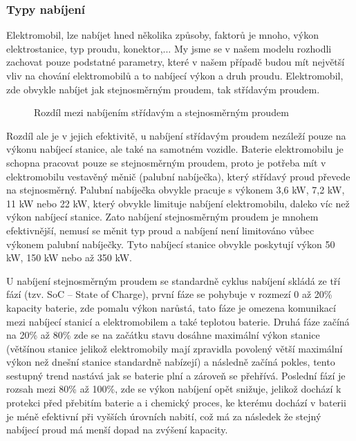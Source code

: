 \documentclass[a4paper,11pt]{article}
\begin{document}
\subsubsection{Typy nabíjení}
Elektromobil, lze nabíjet hned několika způsoby, faktorů je mnoho, výkon elektrostanice, typ proudu, 
konektor,... My jsme se v našem modelu rozhodli zachovat pouze podstatné parametry, které v našem 
případě budou mít největší vliv na chování elektromobilů a to nabíjecí výkon a druh proudu. 
Elektromobil, zde obvykle nabíjet jak stejnosměrným proudem, tak střídavým proudem.

\begin{figure}[H]
    \centering
    \caption{Rozdíl mezi nabíjením střídavým a stejnosměrným proudem \cite{rozdil_mezi_ac_dc_nabijenim}}
    \label{figure:difference-between-ac-and-cd-charging-ev}
\end{figure}

Rozdíl ale je v jejich efektivitě, u nabíjení střídavým proudem nezáleží pouze na výkonu nabíjecí stanice, 
ale také na samotném vozidle. Baterie elektromobilu je schopna pracovat pouze se stejnosměrným proudem, 
proto je potřeba mít v elektromobilu vestavěný měnič (palubní nabíječka), který střídavý proud převede 
na stejnosměrný. Palubní nabíječka obvykle pracuje s výkonem 3,6 kW, 7,2 kW, 11 kW nebo 22 kW,
který obvykle limituje nabíjení elektromobilu, daleko víc než výkon nabíjecí stanice. \cite{nabijeni_ev}
Zato nabíjení stejnosměrným proudem je mnohem efektivnější, nemusí se měnit typ proud a nabíjení není limitováno
vůbec výkonem palubní nabíječky. Tyto nabíjecí stanice obvykle poskytují výkon 50 kW, 150 kW nebo až 350 kW.\cite{nabijeni_ev, data_brno}

U nabíjení stejnosměrným proudem se standardně cyklus nabíjení skládá ze tří fází (tzv. SoC -- State of Charge), první
fáze se pohybuje v rozmezí 0 až 20\% kapacity baterie, zde pomalu výkon narůstá, tato fáze je omezena komunikací
mezi nabíjecí stanicí a elektromobilem a také teplotou baterie. Druhá fáze začíná na 20\% až 80\% zde se na začátku
stavu dosáhne maximální výkon stanice (většínou stanice jelikož elektromobily mají zpravidla povolený větší maximální výkon
než dnešní stanice standardně nabízejí) a následně začíná pokles, tento sestupný trend nastává jak se baterie plní a
zároveň se přehřívá. Poslední fází je rozsah mezi 80\% až 100\%, zde se výkon nabíjení opět snižuje, jelikož
dochází k protekci před přebitím baterie a i chemický proces, ke kterému dochází v baterii je méně efektivní 
při vyšších úrovních nabití, což má za následek že stejný nabíjecí proud má menší dopad na zvýšení kapacity. \cite{nabijeci_krivka}
\end{document}

